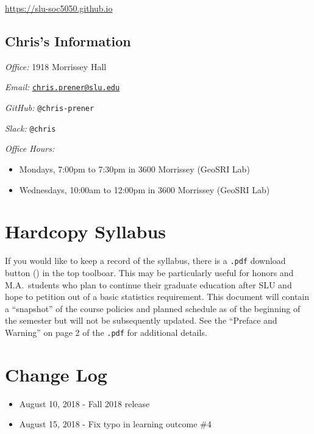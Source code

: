 \documentclass[]{book}
\providecommand{\tightlist}{%
  \setlength{\itemsep}{0pt}\setlength{\parskip}{0pt}}
\theoremstyle{definition}
\theoremstyle{definition}
\theoremstyle{definition}
\theoremstyle{remark}
\begin{document}
\url{https://slu-soc5050.github.io}

\hypertarget{chriss-information}{%
\subsection*{Chris's Information}\label{chriss-information}}

\emph{Office:} 1918 Morrissey Hall

\emph{Email:}
\href{mailto:chris.prener@slu.edu}{\nolinkurl{chris.prener@slu.edu}}

\emph{GitHub:} \texttt{@chris-prener}

\emph{Slack:} \texttt{@chris}

\emph{Office Hours:}

\begin{itemize}
\item
  Mondays, 7:00pm to 7:30pm in 3600 Morrissey (GeoSRI Lab)
\item
  Wednesdays, 10:00am to 12:00pm in 3600 Morrissey (GeoSRI Lab)
\end{itemize}

\hypertarget{hardcopy-syllabus}{%
\section*{Hardcopy Syllabus}\label{hardcopy-syllabus}}

If you would like to keep a record of the syllabus, there is a
\texttt{.pdf} download button () in the top toolboar. This may be
particularly useful for honors and M.A.~students who plan to continue
their graduate education after SLU and hope to petition out of a basic
statistics requirement. This document will contain a ``snapshot'' of the
course policies and planned schedule as of the beginning of the semester
but will not be subsequently updated. See the ``Preface and Warning'' on
page 2 of the \texttt{.pdf} for additional details.

\hypertarget{change-log}{%
\section*{Change Log}\label{change-log}}

\begin{itemize}
\tightlist
\item
  August 10, 2018 - Fall 2018 release
\item
  August 15, 2018 - Fix typo in learning outcome \#4
\end{itemize}
\end{document}
